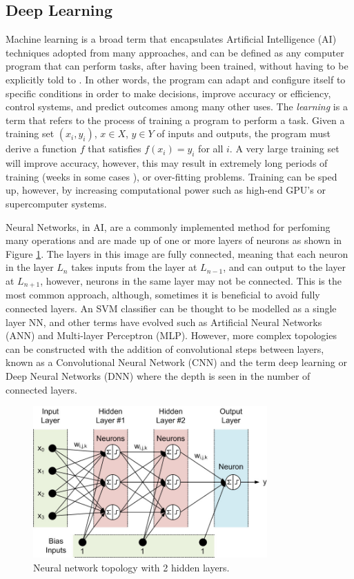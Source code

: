 \documentclass[fleqn,twoside,12pt]{report}
\begin{document}
\subsection{Deep Learning}

Machine learning is a broad term that encapsulates Artificial Intelligence (AI) techniques adopted from many approaches, and can be defined as any  computer program that can perform tasks, after having been trained,  without having to be explicitly told to \cite{langley,shavlik,mohri}. In other words, the program can adapt and configure itself to specific conditions in order to make decisions, improve accuracy or efficiency, control systems, and predict outcomes among many other uses. The \textit{learning} is a term that refers to the process of training a program to perform a task. Given a training set $(x_i, y_i)$, $x\in X$, $y\in Y$ of inputs and outputs, the program must derive a function $f$ that satisfies $f(x_i) = y_i$ for all $i$. A very large training set will improve accuracy, however, this may result in extremely long periods of training (weeks in some cases \cite{bottou}), or over-fitting problems. Training can be sped up, however, by increasing computational power such as high-end GPU's or supercomputer systems.

Neural Networks, in AI, are a commonly implemented method for perfoming many operations and are made up of one or more layers of neurons as shown in Figure \ref{fig:neural_net}. The layers in this image are fully connected, meaning that each neuron in the layer $L_n$ takes inputs from the layer at $L_{n-1}$, and can output to the layer at $L_{n+1}$, however, neurons in the same layer may not be connected. This is the most common approach, although, sometimes it is beneficial to avoid fully connected layers. An SVM classifier can be thought to be modelled as a single layer NN, and other terms have evolved such as Artificial Neural Networks (ANN) and Multi-layer Perceptron (MLP). However, more complex topologies can be constructed with the addition of convolutional steps between layers, known as a Convolutional Neural Network (CNN) and the term deep learning or Deep Neural Networks (DNN) where the depth is seen in the number of connected layers.  

\begin{figure}[h]
	\centering
	\includegraphics[width=0.8\textwidth]{neural_net.jpeg}
	\caption{Neural network topology with 2 hidden layers.}
	\label{fig:neural_net}
\end{figure}
\end{document}
